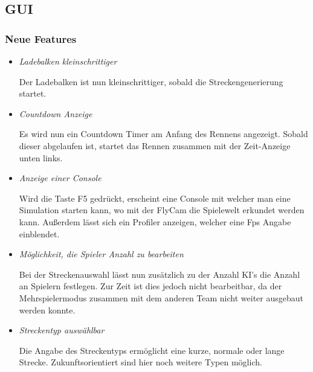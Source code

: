 \subsection{GUI}

\subsubsection{Neue Features}
\begin{itemize}
    \item \textit{Ladebalken kleinschrittiger}
        \begin{leftbar}[0.9\linewidth]
            Der Ladebalken ist nun kleinschrittiger, sobald die 
            Streckengenerierung startet.
        \end{leftbar}
    \item \textit{Countdown Anzeige}
        \begin{leftbar}[0.9\linewidth]
            Es wird nun ein Countdown Timer am Anfang des Rennens 
            angezeigt. Sobald dieser abgelaufen ist, startet das 
            Rennen zusammen mit der Zeit-Anzeige unten links.
        \end{leftbar}
    \item \textit{Anzeige einer Console}
        \begin{leftbar}[0.9\linewidth]
            Wird die Taste F5 gedrückt, erscheint eine Console mit 
            welcher man eine Simulation starten kann, wo mit 
            der FlyCam die Spielewelt erkundet werden kann.
            Außerdem lässt sich ein Profiler anzeigen, welcher 
            eine Fps Angabe einblendet.
        \end{leftbar}
    \item \textit{Möglichkeit, die Spieler Anzahl zu bearbeiten}
        \begin{leftbar}[0.9\linewidth]
            Bei der Streckenauswahl lässt nun zusätzlich zu der Anzahl
            KI's die Anzahl an Spielern festlegen. Zur Zeit ist dies
            jedoch nicht bearbeitbar, da der Mehrspielermodus 
            zusammen mit dem anderen Team nicht weiter ausgebaut 
            werden konnte.
        \end{leftbar}
    \item \textit{Streckentyp auswählbar}
        \begin{leftbar}[0.9\linewidth]
            Die Angabe des Streckentyps ermöglicht eine kurze,
            normale oder lange Strecke. Zukunftsorientiert sind 
            hier noch weitere Typen möglich.

\end{leftbar}
\end{itemize}
